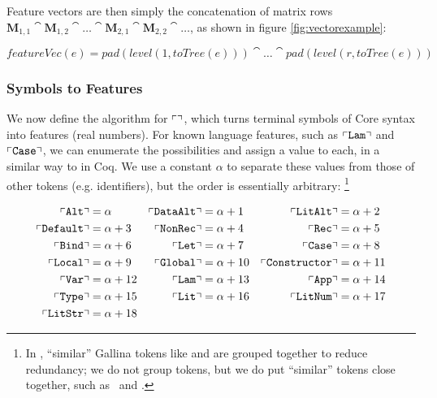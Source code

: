 \begin{sloppypar}
Feature vectors are then simply the concatenation of matrix rows $\mathbf{M}_{1,1} \cat \mathbf{M}_{1,2} \cat \dots \cat \mathbf{M}_{2,1} \cat \mathbf{M}_{2,2} \cat \dots$, as shown in figure \ref{fig:vectorexample}:
\end{sloppypar}

\begin{equation}
  featureVec(e) = pad(level(1, toTree(e))) \cat \dots \cat pad(level(r, toTree(e)))
\end{equation}

\subsubsection{Symbols to Features}

\iffalse TODO: Maybe present recurrent clustering in a ``naive'' way: define the conversion function ``[]'' recursively. Leave the dependency-ordering, etc. for the Algorithm section, as a way of ``building up to'' the result, which avoids the inefficiencies of recursing. \fi

We now define the algorithm for $\left\ulcorner  \right\urcorner$, which turns terminal symbols of Core syntax into features (real numbers). For known language features, such as $\left\ulcorner \texttt{Lam} \right\urcorner$ and $\left\ulcorner \texttt{Case} \right\urcorner$, we can enumerate the possibilities and assign a value to each, in a similar way to \citep{DBLP:journals/corr/HerasK14} in Coq. We use a constant $\alpha$ to separate these values from those of other tokens (e.g. identifiers), but the order is essentially arbitrary: \footnote{In \citep{DBLP:journals/corr/HerasK14}, ``similar'' Gallina tokens like  and  are grouped together to reduce redundancy; we do not group tokens, but we do put ``similar'' tokens close together, such as \CLocal\ and \CGlobal.}

\begin{align*}
  \left\ulcorner \texttt{Alt} \right\urcorner          &= \alpha      &
  \left\ulcorner \texttt{DataAlt} \right\urcorner      &= \alpha + 1  &
  \left\ulcorner \texttt{LitAlt} \right\urcorner       &= \alpha + 2  \\
  \left\ulcorner \texttt{Default} \right\urcorner      &= \alpha + 3  &
  \left\ulcorner \texttt{NonRec} \right\urcorner       &= \alpha + 4  &
  \left\ulcorner \texttt{Rec} \right\urcorner          &= \alpha + 5  \\
  \left\ulcorner \texttt{Bind} \right\urcorner         &= \alpha + 6  &
  \left\ulcorner \texttt{Let} \right\urcorner          &= \alpha + 7  &
  \left\ulcorner \texttt{Case} \right\urcorner         &= \alpha + 8  \\
  \left\ulcorner \texttt{Local} \right\urcorner        &= \alpha + 9  &
  \left\ulcorner \texttt{Global} \right\urcorner       &= \alpha + 10 &
  \left\ulcorner \texttt{Constructor} \right\urcorner  &= \alpha + 11 \\
  \left\ulcorner \texttt{Var} \right\urcorner          &= \alpha + 12 &
  \left\ulcorner \texttt{Lam} \right\urcorner          &= \alpha + 13 &
  \left\ulcorner \texttt{App} \right\urcorner          &= \alpha + 14 \\
  \left\ulcorner \texttt{Type} \right\urcorner         &= \alpha + 15 &
  \left\ulcorner \texttt{Lit} \right\urcorner          &= \alpha + 16 &
  \left\ulcorner \texttt{LitNum} \right\urcorner       &= \alpha + 17 \\
  \left\ulcorner \texttt{LitStr} \right\urcorner       &= \alpha + 18
\end{align*}

